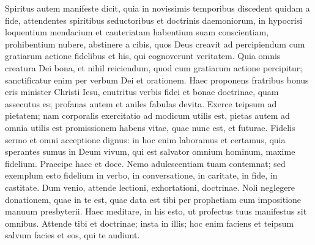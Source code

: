 \begin{biblechapter} 
\verse Spiritus autem manifeste dicit, quia in novissimis temporibus discedent quidam a fide, attendentes spiritibus seductoribus et doctrinis daemoniorum,  
\verse in hypocrisi loquentium mendacium et cauteriatam habentium suam conscientiam, 
\verse prohibentium nubere, abstinere a cibis, quos Deus creavit ad percipiendum cum gratiarum actione fidelibus et his, qui cognoverunt veritatem. 
\verse Quia omnis creatura Dei bona, et nihil reiciendum, quod cum gratiarum actione percipitur; 
\verse sanctificatur enim per verbum Dei et orationem. 
\verse Haec proponens fratribus bonus eris minister Christi Iesu, enutritus verbis fidei et bonae doctrinae, quam assecutus es; 
\verse profanas autem et aniles fabulas devita. Exerce teipsum ad pietatem; 
\verse nam corporalis exercitatio ad modicum utilis est, pietas autem ad omnia utilis est promissionem habens vitae, quae nunc est, et futurae. 
\verse Fidelis sermo et omni acceptione dignus: 
\verse in hoc enim laboramus et certamus, quia sperantes sumus in Deum vivum, qui est salvator omnium hominum, maxime fidelium. 
\verse Praecipe haec et doce. 
\verse Nemo adulescentiam tuam contemnat; sed exemplum esto fidelium in verbo, in conversatione, in caritate, in fide, in castitate. 
\verse Dum venio, attende lectioni, exhortationi, doctrinae. 
\verse Noli neglegere donationem, quae in te est, quae data est tibi per prophetiam cum impositione manuum presbyterii. 
\verse Haec meditare, in his esto, ut profectus tuus manifestus sit omnibus. 
\verse Attende tibi et doctrinae; insta in illis; hoc enim faciens et teipsum salvum facies et eos, qui te audiunt. 
\end{biblechapter}

